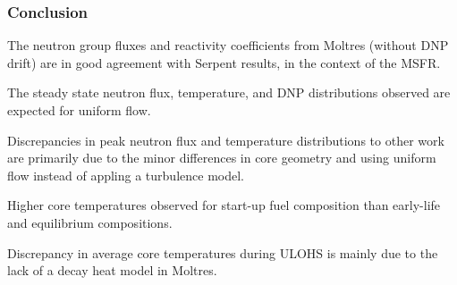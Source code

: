 \begin{frame}
	\frametitle{Conclusion}
		The neutron group fluxes and reactivity coefficients from Moltres
		(without \gls{DNP} drift) are in
		good agreement with Serpent results, in the context of the \gls{MSFR}.
		
		\vspace{.3cm}
		The steady state neutron flux, temperature, and \gls{DNP} distributions
		observed are expected for uniform flow.
		
		\vspace{.3cm}
		Discrepancies in peak neutron
		flux and temperature distributions to other work are primarily due to
		the minor differences in core geometry and using uniform flow instead of
		appling a turbulence model.
		
		\vspace{.3cm}
		Higher core temperatures observed for start-up fuel composition than
		early-life and equilibrium compositions.
		
		\vspace{.3cm}
		Discrepancy in average core temperatures during \gls{ULOHS} is mainly due
		to the lack of a decay heat model in Moltres.
\end{frame}